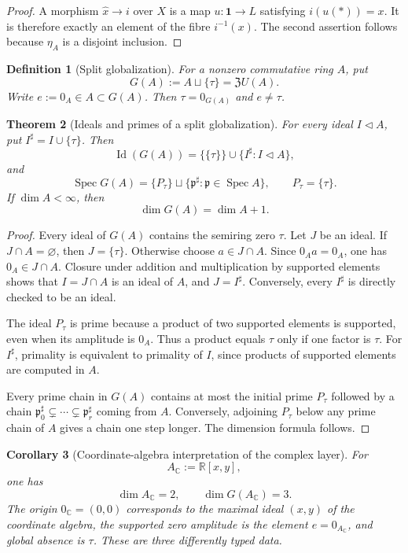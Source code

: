 \documentclass[11pt]{article}
\newtheorem{definition}{Definition}
\newtheorem{theorem}[definition]{Theorem}
\newtheorem{corollary}[definition]{Corollary}
\newcommand{\R}{\mathbb R}
\newcommand{\C}{\mathbb C}
\newcommand{\Spec}{\operatorname{Spec}}
\begin{document}
\begin{proof}
A morphism $\widehat x\to i$ over $X$ is a map $u:\mathbf1\to L$ satisfying $i(u(*))=x$.  It is therefore exactly an element of the fibre $i^{-1}(x)$.  The second assertion follows because $\eta_A$ is a disjoint inclusion.
\end{proof}

\begin{definition}[Split globalization]
For a nonzero commutative ring $A$, put
\[
G(A):=A\sqcup\{\tau\}=\mathfrak ZU(A).
\]
Write $e:=0_A\in A\subset G(A)$.  Then $\tau=0_{G(A)}$ and $e\ne\tau$.
\end{definition}

\begin{theorem}[Ideals and primes of a split globalization]
For every ideal $I\triangleleft A$, put $I^\sharp=I\cup\{\tau\}$.  Then
\[
\operatorname{Id}(G(A))=\{\{\tau\}\}\cup\{I^\sharp:I\triangleleft A\},
\]
and
\[
\Spec G(A)=\{P_\tau\}\sqcup\{\mathfrak p^\sharp:\mathfrak p\in\Spec A\},
\qquad P_\tau=\{\tau\}.
\]
If $\dim A<\infty$, then
\[
\dim G(A)=\dim A+1.
\]
\end{theorem}

\begin{proof}
Every ideal of $G(A)$ contains the semiring zero $\tau$.  Let $J$ be an ideal.  If $J\cap A=\varnothing$, then $J=\{\tau\}$.  Otherwise choose $a\in J\cap A$.  Since $0_Aa=0_A$, one has $0_A\in J\cap A$.  Closure under addition and multiplication by supported elements shows that $I=J\cap A$ is an ideal of $A$, and $J=I^\sharp$.  Conversely, every $I^\sharp$ is directly checked to be an ideal.

The ideal $P_\tau$ is prime because a product of two supported elements is supported, even when its amplitude is $0_A$.  Thus a product equals $\tau$ only if one factor is $\tau$.  For $I^\sharp$, primality is equivalent to primality of $I$, since products of supported elements are computed in $A$.

Every prime chain in $G(A)$ contains at most the initial prime $P_\tau$ followed by a chain $\mathfrak p_0^\sharp\subsetneq\cdots\subsetneq\mathfrak p_r^\sharp$ coming from $A$.  Conversely, adjoining $P_\tau$ below any prime chain of $A$ gives a chain one step longer.  The dimension formula follows.
\end{proof}

\begin{corollary}[Coordinate-algebra interpretation of the complex layer]
For
\[
A_{\C}:=\R[x,y],
\]
one has
\[
\dim A_{\C}=2,
\qquad
\dim G(A_{\C})=3.
\]
The origin $0_{\C}=(0,0)$ corresponds to the maximal ideal $(x,y)$ of the coordinate algebra, the supported zero amplitude is the element $e=0_{A_{\C}}$, and global absence is $\tau$.  These are three differently typed data.
\end{corollary}
\end{document}
